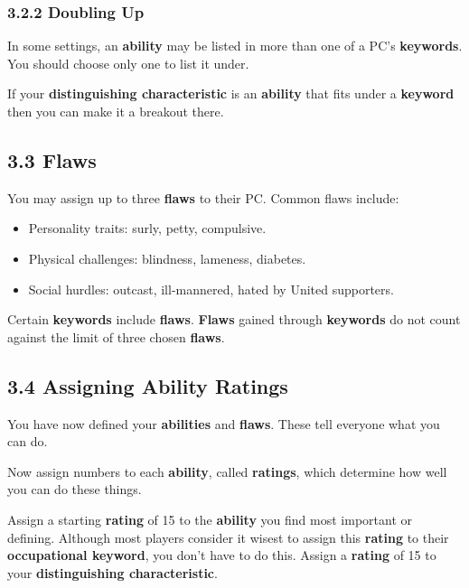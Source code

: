 \documentclass[
  11pt,
]{article}
\providecommand{\tightlist}{%
  \setlength{\itemsep}{0pt}\setlength{\parskip}{0pt}}
\begin{document}
\hypertarget{doubling-up}{%
\subsubsection{3.2.2 Doubling Up}\label{doubling-up}}

In some settings, an \textbf{ability} may be listed in more than one of
a PC's \textbf{keywords}. You should choose only one to list it under.

If your \textbf{distinguishing characteristic} is an \textbf{ability}
that fits under a \textbf{keyword} then you can make it a breakout
there.

\hypertarget{flaws-1}{%
\subsection{3.3 Flaws}\label{flaws-1}}

You may assign up to three \textbf{flaws} to their PC. Common flaws
include:

\begin{itemize}
\tightlist
\item
  Personality traits: surly, petty, compulsive.
\item
  Physical challenges: blindness, lameness, diabetes.
\item
  Social hurdles: outcast, ill-mannered, hated by United supporters.
\end{itemize}

Certain \textbf{keywords} include \textbf{flaws}. \textbf{Flaws} gained
through \textbf{keywords} do not count against the limit of three chosen
\textbf{flaws}.

\hypertarget{assigning-ability-ratings}{%
\subsection{3.4 Assigning Ability
Ratings}\label{assigning-ability-ratings}}

You have now defined your \textbf{abilities} and \textbf{flaws}. These
tell everyone what you can do.

Now assign numbers to each \textbf{ability}, called \textbf{ratings},
which determine how well you can do these things.

Assign a starting \textbf{rating} of 15 to the \textbf{ability} you find
most important or defining. Although most players consider it wisest to
assign this \textbf{rating} to their \textbf{occupational keyword}, you
don't have to do this. Assign a \textbf{rating} of 15 to your
\textbf{distinguishing characteristic}.
\end{document}
